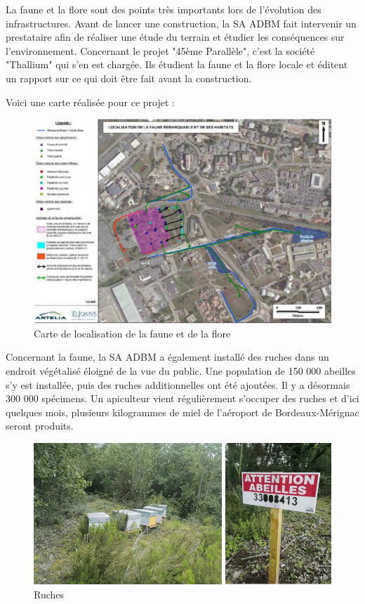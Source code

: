 La faune et la flore sont des points très importants lors de l'évolution des infrastructures. Avant de lancer une construction, la SA ADBM fait intervenir un prestataire afin de réaliser une étude du terrain et étudier les conséquences sur l'environnement.
Concernant le projet "45ème Parallèle", c'est la société "Thallium" qui s'en est chargée. Ils étudient la faune et la flore locale et éditent un rapport sur ce qui doit être fait avant la construction.\newline

Voici une carte réalisée pour ce projet :

\begin{figure}[hbt!]
  \centering
  \includegraphics[width=14cm]{Images/carteenvironnement.png}
  \caption{Carte de localisation de la faune et de la flore}
  \label{fig:crapeau}
\end{figure}

Concernant la faune, la SA ADBM a également installé des ruches dans un endroit végétalisé éloigné de la vue du public. Une population de 150 000 abeilles s'y est installée, puis des ruches additionnelles ont été ajoutées. Il y a désormais 300 000 spécimens. Un apiculteur vient régulièrement s'occuper des ruches et d'ici quelques mois, plusieurs kilogrammes de miel de l'aéroport de Bordeaux-Mérignac seront produits.

 \begin{figure}[hbt!]
   \centering
   \includegraphics[width=14cm]{Images/ruches.jpg}
   \caption{Ruches}
   \label{fig:abeilles}
 \end{figure}

